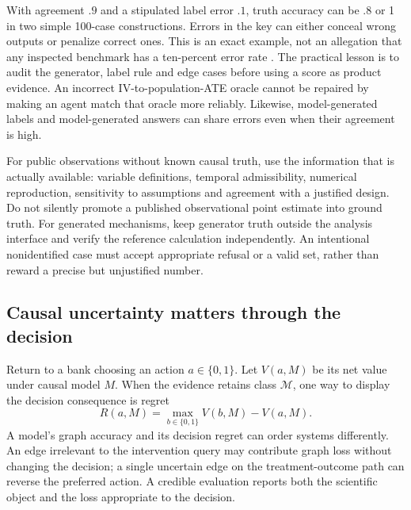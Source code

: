 With agreement $.9$ and a stipulated label error $.1$, truth accuracy can be
$.8$ or 1 in two simple 100-case constructions. Errors in the key can either
conceal wrong outputs or penalize correct ones. This is an exact example, not
an allegation that any inspected benchmark has a ten-percent error rate
\citep{exec13_frontier_exact}. The practical lesson is to audit the generator,
label rule and edge cases before using a score as product evidence. An
incorrect IV-to-population-ATE oracle cannot be repaired by making an agent
match that oracle more reliably. Likewise, model-generated labels and
model-generated answers can share errors even when their agreement is high.

For public observations without known causal truth, use the information that
is actually available: variable definitions, temporal admissibility, numerical
reproduction, sensitivity to assumptions and agreement with a justified design.
Do not silently promote a published observational point estimate into ground
truth. For generated mechanisms, keep generator truth outside the analysis
interface and verify the reference calculation independently. An intentional
nonidentified case must accept appropriate refusal or a valid set, rather than
reward a precise but unjustified number.

\subsection{Causal uncertainty matters through the decision}

Return to a bank choosing an action $a\in\{0,1\}$. Let $V(a,M)$ be its net
value under causal model $M$. When the evidence retains class $\mathcal M$,
one way to display the decision consequence is regret
\begin{equation}
 R(a,M)=\max_{b\in\{0,1\}}V(b,M)-V(a,M).
 \label{exec13:frontier-regret}
\end{equation}
A model's graph accuracy and its decision regret can order systems differently.
An edge irrelevant to the intervention query may contribute graph loss without
changing the decision; a single uncertain edge on the treatment-outcome path
can reverse the preferred action. A credible evaluation reports both the
scientific object and the loss appropriate to the decision.

